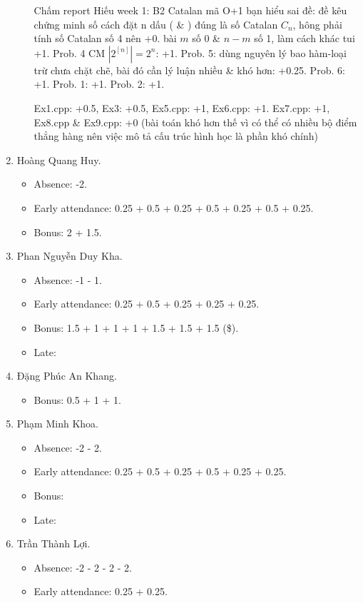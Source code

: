 \documentclass{article}
\begin{document}
\begin{enumerate}
\begin{itemize}
		Chấm report Hiếu week 1: B2 Catalan mã O+1 bạn hiểu sai đề: đề kêu chứng minh số cách đặt n dấu ( \& ) đúng là số Catalan $C_n$, hông phải tính số Catalan số 4 nên +0. bài $m$ số 0 \& $n - m$ số 1, làm cách khác tui +1. Prob. 4 CM $|2^[n]| =2^n$: +1. Prob. 5: dùng nguyên lý bao hàm-loại trừ chưa chặt chẽ, bài đó cần lý luận nhiều \& khó hơn: +0.25. Prob. 6: +1. Prob. 1: +1. Prob. 2: +1.
		
		Ex1.cpp: +0.5, Ex3: +0.5, Ex5.cpp: +1, Ex6.cpp: +1. Ex7.cpp: +1, Ex8.cpp \& Ex9.cpp: +0 (bài toán khó hơn thế vì có thể có nhiều bộ điểm thẳng hàng nên việc mô tả cấu trúc hình học là phần khó chính)
	\end{itemize}
	\item {\sc Hoàng Quang Huy.}
	\begin{itemize}
		\item Absence: -2.
		\item Early attendance: 0.25 + 0.5 + 0.25 + 0.5 + 0.25 + 0.5 + 0.25.
		\item Bonus: 2 + 1.5.
	\end{itemize}
	\item {\sc Phan Nguyễn Duy Kha.}
	\begin{itemize}
		\item Absence: -1 - 1.
		\item Early attendance: 0.25 + 0.5 + 0.25 + 0.25 + 0.25.
		\item Bonus: 1.5 + 1 + 1 + 1 + 1.5 + 1.5 + 1.5 (\$).
		\item Late: 
	\end{itemize}
	\item {\sc Đặng Phúc An Khang.}
	\begin{itemize}
		\item Bonus: 0.5 + 1 + 1.
	\end{itemize}
	\item {\sc Phạm Minh Khoa.}
	\begin{itemize}
		\item Absence: -2 - 2.
		\item Early attendance: 0.25 + 0.5 + 0.25 + 0.5 + 0.25 + 0.25.
		\item Bonus:
		\item Late: 
	\end{itemize}
	\item {\sc Trần Thành Lợi.}
	\begin{itemize}
		\item Absence: -2 - 2 - 2 - 2.
		\item Early attendance: 0.25 + 0.25.

\end{itemize}
\end{enumerate}
\end{document}
